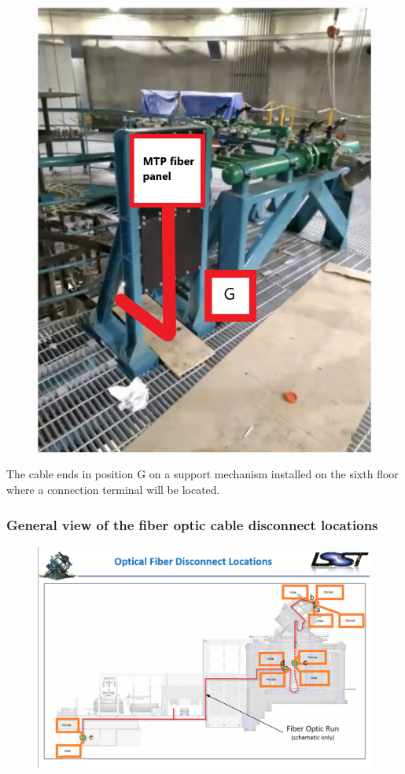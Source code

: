   \begin{figure}
    \centering
  \includegraphics[width=12cm]{images/21.png}
  \label{fig:jlsimon}
  \end{figure}

  The cable ends in position G on a support mechanism installed on the sixth floor where a connection terminal will be located.
\newpage

\subsubsection{General view of the fiber optic cable disconnect locations}
  
  \begin{figure}
  \includegraphics[width=\textwidth]{images/22.png}
  \label{fig:jlsimon}
  \end{figure}


